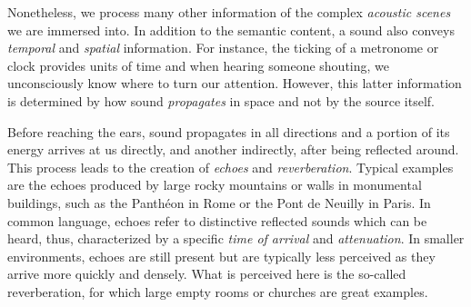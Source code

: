 
\mynewline
Nonetheless, we process many other information of the complex \textit{acoustic scenes} we are immersed into.
In addition to the semantic content, a sound also conveys \textit{temporal} and \textit{spatial} information.
For instance, the ticking of a metronome or clock provides units of time and when hearing someone shouting, we unconsciously know where to turn our attention.
However, this latter information is determined by how sound \textit{propagates} in space and not by the source itself.

\mynewline
Before reaching the ears, sound propagates in all directions and a portion of its energy arrives at us directly, and another indirectly, after being reflected around.
This process leads to the creation of \textit{echoes} and \textit{reverberation}.
Typical examples are the echoes produced by large rocky mountains or walls in monumental buildings, such as the Panthéon in Rome or the Pont de Neuilly in Paris.
In common language, echoes refer to distinctive reflected sounds which can be heard, thus, characterized by a specific \textit{time of arrival} and \textit{attenuation}.
In smaller environments, echoes are still present but are typically less perceived as they arrive more quickly and densely.
What is perceived here is the so-called reverberation, for which large empty rooms or churches are great examples.


